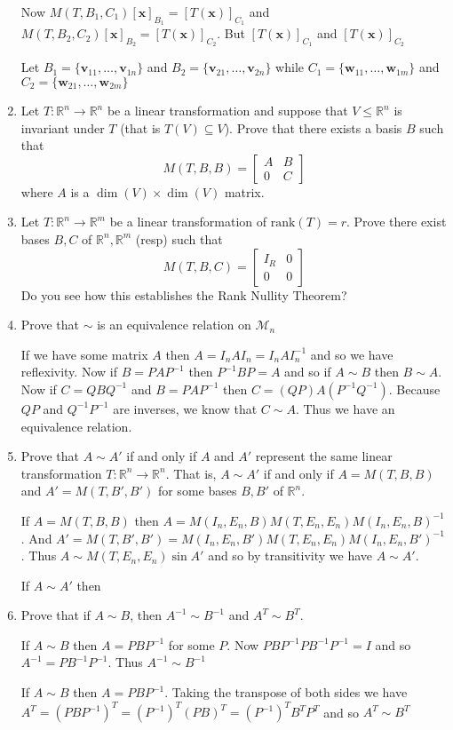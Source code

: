 \documentclass[letterpaper]{article}
\newcommand{\rank}{\text{rank}}
\begin{document}
\begin{enumerate}
Now $M(T,B_1,C_1)[\mathbf{x}]_{B_1}=[T(\mathbf{x})]_{C_1}$
and $M(T,B_2,C_2)[\mathbf{x}]_{B_2}=[T(\mathbf{x})]_{C_2}$.
But $[T(\mathbf{x})]_{C_1}$ and $[T(\mathbf{x})]_{C_2}$

Let $B_1=\{\mathbf{v}_{11},\dots,\mathbf{v}_{1n}\}$
and $B_2=\{\mathbf{v}_{21},\dots,\mathbf{v}_{2n}\}$
while $C_1=\{\mathbf{w}_{11},\dots,\mathbf{w}_{1m}\}$
and $C_2=\{\mathbf{w}_{21},\dots,\mathbf{w}_{2m}\}$
\item
Let $T:\mathbb{R}^n\to\mathbb{R}^n$ be a linear transformation and suppose that $V\le \mathbb{R}^n$ is invariant under $T$ (that is $T(V)\subseteq V$). Prove that there exists a basis $B$ such that
\[M(T,B,B)=\left[\begin{array}{rr}A&B\\0&C\end{array}\right]\]
where $A$ is a $\dim(V)\times\dim(V)$ matrix.
\item
Let $T:\mathbb{R}^n\to\mathbb{R}^m$ be a linear transformation of $\rank(T)=r$. Prove there exist bases $B,C$ of $\mathbb{R}^n,\mathbb{R}^m$ (resp) such that
\[M(T,B,C)=\left[\begin{array}{rr}I_R&0\\0&0\end{array}\right]\]
Do you see how this establishes the Rank Nullity Theorem?
\item
Prove that $\sim$ is an equivalence relation on $\mathcal{M}_n$

If we have some matrix $A$ then $A=I_nAI_n=I_nAI_n^{-1}$ and so we have reflexivity. Now if $B=PAP^{-1}$ then $P^{-1}BP=A$ and so if $A\sim B$ then $B\sim A$. Now if $C=QBQ^{-1}$ and $B=PAP^{-1}$ then $C=(QP)A(P^{-1}Q^{-1})$. Because $QP$ and $Q^{-1}P^{-1}$ are inverses, we know that $C\sim A$. Thus we have an equivalence relation.
\item
Prove that $A\sim A'$ if and only if $A$ and $A'$ represent the same linear transformation $T:\mathbb{R}^n\to\mathbb{R}^n$.  That is, $A\sim A'$ if and only if $A=M(T,B,B)$ and $A'=M(T,B',B')$ for some bases $B,B'$ of $\mathbb{R}^n$.

If $A=M(T,B,B)$ then $A=M(I_n,E_n,B)M(T,E_n,E_n)M(I_n,E_n,B)^{-1}$. And $A'=M(T,B',B')=M(I_n,E_n,B')M(T,E_n,E_n)M(I_n,E_n,B')^{-1}$. Thus $A\sim M(T,E_n,E_n)\sin A'$ and so by transitivity we have $A\sim A'$.

If $A\sim A'$ then
\item
Prove that if $A\sim B$, then $A^{-1}\sim B^{-1}$ and $A^T\sim B^T$.

If $A\sim B$ then $A=PBP^{-1}$ for some $P$. Now $PBP^{-1}PB^{-1}P^{-1}=I$ and so $A^{-1}=PB^{-1}P^{-1}$. Thus $A^{-1}\sim B^{-1}$

If $A\sim B$ then $A=PBP^{-1}$.  Taking the transpose of both sides we have $A^T=(PBP^{-1})^T=(P^{-1})^T(PB)^T=(P^{-1})^TB^TP^T$ and so $A^T\sim B^T$
\end{enumerate}
\end{document}
